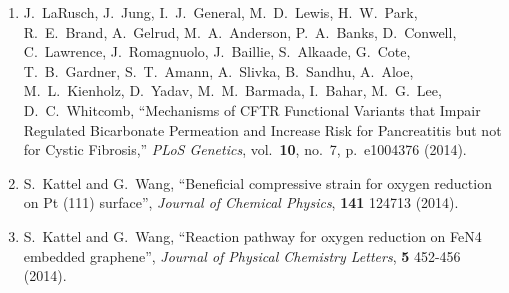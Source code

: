 \begin{enumerate}
\item J.\ LaRusch, J.\ Jung, I.\ J.\ General, M.\ D.\ Lewis,
  H.\ W.\ Park, R.\ E.\ Brand, A.\ Gelrud, M.\ A.\ Anderson,
  P.\ A.\ Banks, D.\ Conwell, C.\ Lawrence, J.\ Romagnuolo,
  J.\ Baillie, S.\ Alkaade, G.\ Cote, T.\ B.\ Gardner, S.\ T.\ Amann,
  A.\ Slivka, B.\ Sandhu, A.\ Aloe, M.\ L.\ Kienholz, D.\ Yadav,
  M.\ M.\ Barmada, I.\ Bahar, M.\ G.\ Lee, D.\ C.\ Whitcomb,
  ``Mechanisms of CFTR Functional Variants that Impair Regulated
  Bicarbonate Permeation and Increase Risk for Pancreatitis but not
  for Cystic Fibrosis,'' \textit{PLoS Genetics}, vol.\ \textbf{10},
  no.\ 7, p.\ e1004376 (2014).

\item S.\ Kattel and G.\ Wang, ``Beneficial compressive strain for
  oxygen reduction on Pt (111) surface'', \textit{Journal of Chemical
    Physics}, \textbf{141} 124713 (2014).

\item S.\ Kattel and G.\ Wang, ``Reaction pathway for oxygen reduction
  on FeN4 embedded graphene'', \textit{Journal of Physical Chemistry
    Letters}, \textbf{5} 452-456 (2014).

\end{enumerate}



